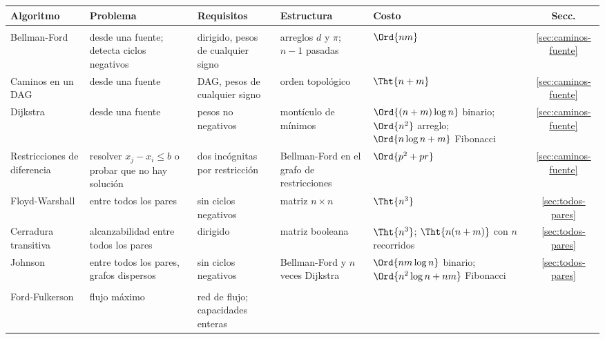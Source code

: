 \documentclass[11pt,letterpaper]{article}
\begin{document}
\begin{center}
\begin{tabular}{@{}>{\raggedright\arraybackslash}p{2.5cm}%
                >{\raggedright\arraybackslash}p{3.3cm}%
                >{\raggedright\arraybackslash}p{3.1cm}%
                >{\raggedright\arraybackslash}p{2.7cm}%
                >{\raggedright\arraybackslash}p{2.9cm}c@{}}
  \toprule
  \textbf{Algoritmo} & \textbf{Problema} & \textbf{Requisitos}
    & \textbf{Estructura} & \textbf{Costo} & \textbf{Secc.} \\
  \midrule
  \multicolumn{6}{@{}l}{\textit{Caminos más cortos}} \\
  \addlinespace[2pt]
  Bellman-Ford & desde una fuente; detecta ciclos negativos
      & dirigido, pesos de cualquier signo
      & arreglos $d$ y $\pi$; $n - 1$ pasadas
      & $\Ord{nm}$ & \ref{sec:caminos-fuente} \\
  \addlinespace
  Caminos en un DAG & desde una fuente
      & DAG, pesos de cualquier signo
      & orden topológico & $\Tht{n + m}$
      & \ref{sec:caminos-fuente} \\
  \addlinespace
  Dijkstra & desde una fuente
      & pesos no negativos
      & montículo de mínimos
      & $\Ord{(n + m) \log n}$ binario; $\Ord{n^2}$ arreglo;
        $\Ord{n \log n + m}$ Fibonacci
      & \ref{sec:caminos-fuente} \\
  \addlinespace
  Restricciones de diferencia & resolver $x_j - x_i \le b$ o probar
        que no hay solución
      & dos incógnitas por restricción
      & Bellman-Ford en el grafo de restricciones
      & $\Ord{p^2 + pr}$ & \ref{sec:caminos-fuente} \\
  \addlinespace
  Floyd-Warshall & entre todos los pares
      & sin ciclos negativos
      & matriz $n \times n$ & $\Tht{n^3}$ & \ref{sec:todos-pares} \\
  \addlinespace
  Cerradura transitiva & alcanzabilidad entre todos los pares
      & dirigido & matriz booleana
      & $\Tht{n^3}$; $\Tht{n(n + m)}$ con $n$ recorridos
      & \ref{sec:todos-pares} \\
  \addlinespace
  Johnson & entre todos los pares, grafos dispersos
      & sin ciclos negativos
      & Bellman-Ford y $n$ veces Dijkstra
      & $\Ord{nm \log n}$ binario; $\Ord{n^2 \log n + nm}$ Fibonacci
      & \ref{sec:todos-pares} \\
  \midrule
  \multicolumn{6}{@{}l}{\textit{Flujo y emparejamiento}} \\
  \addlinespace[2pt]
  Ford-Fulkerson & flujo máximo
      & red de flujo; capacidades enteras

\end{tabular}
\end{center}
\end{document}
